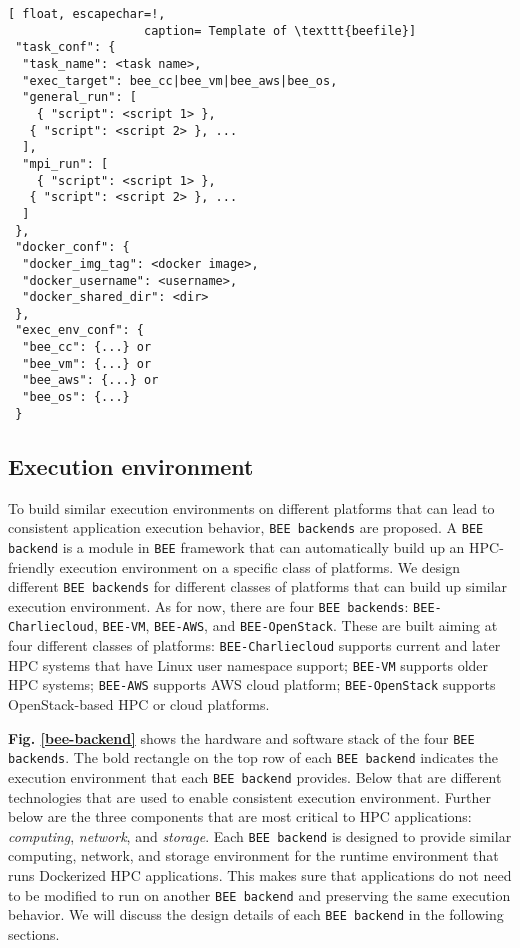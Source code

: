 \lstset{numbers=left,
xleftmargin=1.5em,
frame=single,
framexleftmargin=2em}


\lstset{language=Java}
\begin{lstlisting}[ float, escapechar=!,
				   caption= Template of \texttt{beefile}]
 "task_conf": {
  "task_name": <task name>,
  "exec_target": bee_cc|bee_vm|bee_aws|bee_os,
  "general_run": [
  	{ "script": <script 1> },
   { "script": <script 2> }, ...
  ],
  "mpi_run": [
  	{ "script": <script 1> },
   { "script": <script 2> }, ...
  ]
 },
 "docker_conf": {
  "docker_img_tag": <docker image>,
  "docker_username": <username>,
  "docker_shared_dir": <dir>
 },
 "exec_env_conf": {
  "bee_cc": {...} or
  "bee_vm": {...} or
  "bee_aws": {...} or
  "bee_os": {...} 
 }       

\end{lstlisting}


\subsection{Execution environment}
To build similar execution environments on different platforms that can lead to consistent application execution behavior, \texttt{BEE backends} are proposed. A \texttt{BEE backend} is a module in \texttt{BEE} framework that can automatically build up an HPC-friendly execution environment on a specific class of platforms. We design different \texttt{BEE backends} for different classes of platforms that can build up similar execution environment. As for now, there are four \texttt{BEE backends}: \texttt{BEE-Charliecloud}, \texttt{BEE-VM}, \texttt{BEE-AWS}, and \texttt{BEE-OpenStack}. These are built aiming at four different classes of platforms: \texttt{BEE-Charliecloud} supports current and later HPC systems that have Linux user namespace support; \texttt{BEE-VM} supports older HPC systems; \texttt{BEE-AWS} supports AWS cloud platform; \texttt{BEE-OpenStack} supports OpenStack-based HPC or cloud platforms.

\textbf{Fig. \ref{bee-backend}} shows the hardware and software stack of the four \texttt{BEE backends}. The bold rectangle on the top row of each \texttt{BEE backend} indicates the execution environment that each \texttt{BEE backend} provides. Below that are different technologies that are used to enable consistent execution environment. Further below are the three components that are most critical to HPC applications: \textit{computing}, \textit{network}, and \textit{storage}. Each \texttt{BEE backend} is designed to provide similar computing, network, and storage environment for the runtime environment that runs Dockerized HPC applications. This makes sure that applications do not need to be modified to run on another \texttt{BEE backend} and preserving the same execution behavior. We will discuss the design details of each \texttt{BEE backend} in the following sections.

